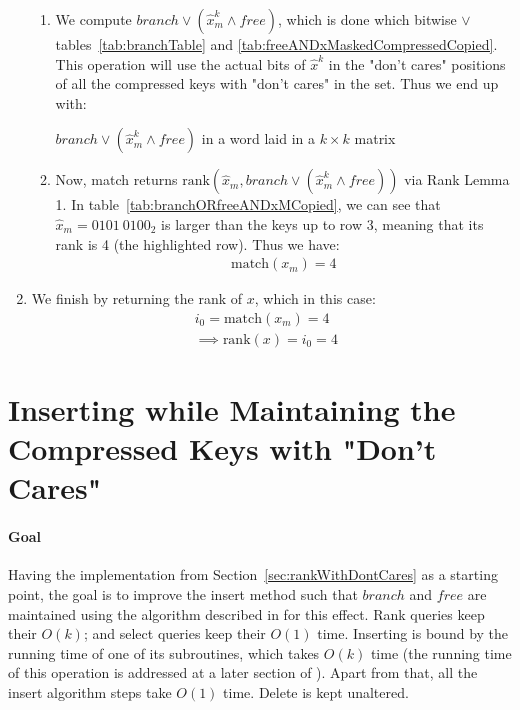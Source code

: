 \begin{enumerate}
\begin{enumerate}
        \item
        We compute $branch \vee (\hat x^k_m \wedge free)$, which is done which bitwise $\vee$ tables~\ref{tab:branchTable} and \ref{tab:freeANDxMaskedCompressedCopied}.
        This operation will use the actual bits of $\hat x^k$ in the "don't cares" positions of all the compressed keys with "don't cares" in the set.
        Thus we end up with:
        \begin{table}[H]
        \centering
        
        \caption[Example of $branch \vee (\hat x^k_m \wedge free)$ in a word laid in a $k \times k$ matrix]{$branch \vee (\hat x^k_m \wedge free)$ in a word laid in a $k \times k$ matrix}
        \label{tab:branchORfreeANDxMCopied}
        \end{table}
        
        \item
        Now, match returns $\text{rank}(\hat x_m, branch \vee (\hat x^k_m \wedge free))$ via Rank Lemma 1. In table~\ref{tab:branchORfreeANDxMCopied}, we can see that $\hat x_m = 0101\ 0100_2$ is larger than the keys up to row 3, meaning that its rank is 4 (the highlighted row). Thus we have:
        \begin{align*}
            \text{match}(x_m) = 4
        \end{align*}
    \end{enumerate}
    
    \item
    We finish by returning the rank of $x$, which in this case:
    \begin{align*}
        i_0 = \text{match}(x_m) = 4& \\
        \implies \text{rank}(x) = i_0 = 4&
    \end{align*}
\end{enumerate}

\newpage
\section{Inserting while Maintaining the Compressed Keys with "Don't Cares"} \label{sec:InsertDontCares}

\paragraph*{Goal}
Having the implementation from Section~\ref{sec:rankWithDontCares} as a starting point, the goal is to improve the insert method such that $branch$ and $free$ are maintained using the algorithm described in \cite{patrascu2014dynamic} for this effect. Rank queries keep their $O(k)$; and select queries keep their $O(1)$ time. Inserting is bound by the running time of one of its subroutines, which takes $O(k)$ time (the running time of this operation is addressed at a later section of \cite{patrascu2014dynamic}). Apart from that, all the insert algorithm steps take $O(1)$ time. Delete is kept unaltered.

